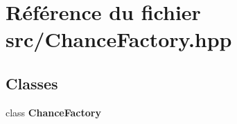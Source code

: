 \section{Référence du fichier src/\-Chance\-Factory.hpp}
\label{_chance_factory_8hpp}
\subsection*{Classes}
\begin{DoxyCompactItemize}
\item 
class {\bf Chance\-Factory}
\end{DoxyCompactItemize}
